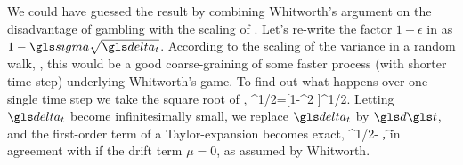 We could have guessed the result by combining Whitworth's argument on the disadvantage of
gambling with the scaling of \BM. Let's re-write the factor $1-\epsilon$ in  as
$1-\gsigma \sqrt{\dt}$. According to the scaling of the variance in a random walk, , 
this would be a good coarse-graining of some faster
process (with shorter time step) underlying Whitworth's game.
To find out what happens over one single time step we take the square root of ,
^{1/2}=[1-\gsigma^2 \dt]^{1/2}.
\ee 
Letting $\dt$ become infinitesimally small, we replace $\dt$ by $\gd \t$, and the first-order
term of a Taylor-expansion becomes exact,
^{1/2}- \gd\t,
\ee 
in agreement with  if the drift term $\mu=0$, as assumed by Whitworth.

